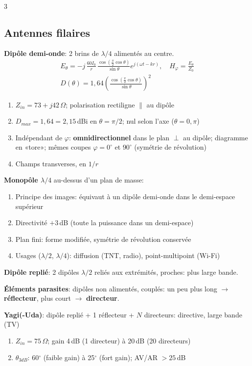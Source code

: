\documentclass[12pt, a4paper]{article}
\begin{document}
\begin{multicols*}{3}
	\colbreak
	\subsection{Antennes filaires}
	\textbf{Dipôle demi-onde}: 2 brins de $\lambda/4$ alimentés au centre.
	\begin{gather*}
		E_\theta=-j\,\frac{60I_0}{r}\,\frac{\cos(\frac\pi2\cos\theta)}{\sin\theta}e^{j(\omega t-kr)},\quad H_\varphi=\frac{E_\theta}{Z_0}\\
		D(\theta)=1{,}64\left(\frac{\cos(\frac\pi2\cos\theta)}{\sin\theta}\right)^2
	\end{gather*}
	\begin{enumerate}[\roman*.]
		\item $Z_{in}=73+j42\,\Omega$; polarisation rectiligne $\parallel$ au dipôle
		\item $D_{max}=1{,}64=2{,}15$\,dBi en $\theta=\pi/2$; nul selon l'axe ($\theta=0,\pi$)
		\item Indépendant de $\varphi$: \textbf{omnidirectionnel} dans le plan $\perp$ au dipôle; diagramme en «tore»; mêmes coupes $\varphi=0^\circ$ et $90^\circ$ (symétrie de révolution)
		\item Champs transverses, en $1/r$
	\end{enumerate}
	\textbf{Monopôle $\lambda/4$} au-dessus d'un plan de masse:
	\begin{enumerate}[\roman*.]
		\item Principe des images: équivaut à un dipôle demi-onde dans le demi-espace supérieur
		\item Directivité $+3$\,dB (toute la puissance dans un demi-espace)
		\item Plan fini: forme modifiée, symétrie de révolution conservée
		\item Usages ($\lambda/2$, $\lambda/4$): diffusion (TNT, radio), point-multipoint (Wi-Fi)
	\end{enumerate}
	\textbf{Dipôle replié}: 2 dipôles $\lambda/2$ reliés aux extrémités, proches: plus large bande.

	\textbf{Éléments parasites}: dipôles non alimentés, couplés: un peu plus long $\to$ \textbf{réflecteur}, plus court $\to$ \textbf{directeur}.

	\textbf{Yagi(-Uda)}: dipôle replié + 1 réflecteur + $N$ directeurs: directive, large bande (TV)
	\begin{enumerate}[\roman*.]
		\item $Z_{in}=75\,\Omega$; gain 4\,dB (1 directeur) à 20\,dB (20 directeurs)
		\item $\theta_{3dB}$: 60$^\circ$ (faible gain) à 25$^\circ$ (fort gain); AV/AR $>25$\,dB
	\end{enumerate}


\end{multicols*}
\end{document}
